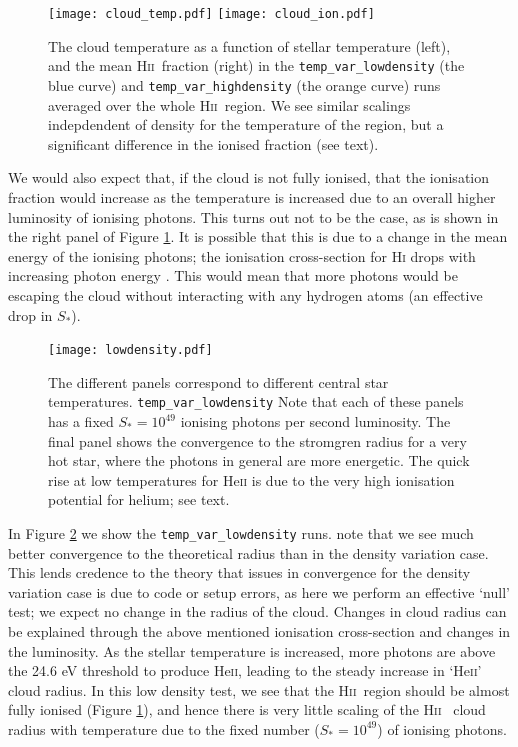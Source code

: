 \documentclass[a4paper]{article}
\newcommand{\hii}{H\textsc{ii}~}
\begin{document}
\begin{figure}[!h]
    \centering
    \texttt{[image: cloud\_temp.pdf]}
    \texttt{[image: cloud\_ion.pdf]}
    \caption{The cloud temperature as a function of stellar temperature (left),
        and the mean \hii fraction (right) in the {\tt temp\_var\_lowdensity}
        (the blue curve) and {\tt temp\_var\_highdensity} (the orange curve)
        runs averaged over the whole \hii region. We see similar scalings
        indepdendent of density for the temperature of the region, but a
        significant difference in the ionised fraction (see text).}
    \label{fig:cloudtemp}
\end{figure}
We would also expect that, if the cloud is not fully ionised, that the
ionisation fraction would increase as the temperature is increased due to an
overall higher luminosity of ionising photons. This turns out not to be the
case, as is shown in the right panel of Figure \ref{fig:cloudtemp}. It is
possible that this is due to a change in the mean energy of the ionising
photons; the ionisation cross-section for H\textsc{i} drops with increasing
photon energy \citep{palenius_absolute_1976}. This would mean that more
photons would be escaping the cloud without interacting with any hydrogen
atoms (an effective drop in $S_*$). 

\begin{figure}[!h]
    \centering
    \texttt{[image: lowdensity.pdf]}
    \caption{The different panels correspond to different central star
        temperatures. {\tt temp\_var\_lowdensity} Note that each of these
        panels has a fixed $S_* = 10^{49}$ ionising photons per second
        luminosity. The final panel shows the convergence to the stromgren
        radius for a very hot star, where the photons in general are more
        energetic. The quick rise at low temperatures for He\textsc{ii} is due to
        the very high ionisation potential for helium; see text.}
    \label{fig:templowdens}
\end{figure}
In Figure \ref{fig:templowdens} we show the {\tt temp\_var\_lowdensity} runs.
note that we see much better convergence to the theoretical
\citet{stromgren_physical_1939} radius than in the density variation case.
This lends credence to the theory that issues in convergence for the density
variation case is due to code or setup errors, as here we perform an effective
`null' test; we expect no change in the radius of the cloud. Changes in cloud
radius can be explained through the above mentioned ionisation cross-section
and changes in the luminosity. As the stellar temperature is increased, more
photons are above the 24.6 eV threshold to produce He\textsc{ii}, leading to
the steady increase in `He\textsc{ii}' cloud radius. In this low density test,
we see that the \hii region should be almost fully ionised (Figure
\ref{fig:cloudtemp}), and hence there is very little scaling of the \hii
cloud radius with temperature due to the fixed number ($S_* = 10^{49}$) of
ionising photons.
\end{document}
